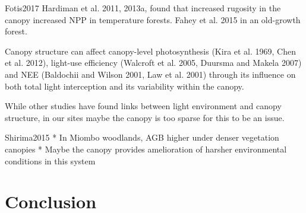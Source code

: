 \documentclass[11pt,a4paper]{article}
\begin{document}
Fotis2017
Hardiman et al. 2011, 2013a, found that increased rugosity in the canopy increased NPP in temperature forests. Fahey et al. 2015 in an old-growth forest.

Canopy structure can affect canopy-level photosynthesis (Kira et al. 1969, Chen et al. 2012), light-use efficiency (Walcroft et al. 2005, Duursma and Makela 2007) and NEE (Baldochii and Wilson 2001, Law et al. 2001) through its influence on both total light interception and its variability within the canopy.

While other studies have found links between light environment and canopy structure, in our sites maybe the canopy is too sparse for this to be an issue.

Shirima2015
* In Miombo woodlands, AGB higher under denser vegetation canopies
	* Maybe the canopy provides amelioration of harsher environmental conditions in this system


\section{Conclusion}

\printbibliography



\end{document}
